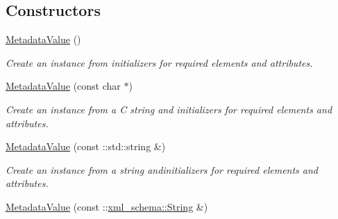 \subsection*{Constructors}
\begin{DoxyCompactItemize}
\item 
\hypertarget{classopenstack_1_1xml_1_1MetadataValue_acc7a6e57c54ab75faa5a0355a40f5956}{
\hyperlink{classopenstack_1_1xml_1_1MetadataValue_acc7a6e57c54ab75faa5a0355a40f5956}{MetadataValue} ()}
\label{classopenstack_1_1xml_1_1MetadataValue_acc7a6e57c54ab75faa5a0355a40f5956}

\begin{DoxyCompactList}\small\item\em Create an instance from initializers for required elements and attributes. \item\end{DoxyCompactList}\item 
\hypertarget{classopenstack_1_1xml_1_1MetadataValue_aa7963aeb675c71ba716501fee786f5a7}{
\hyperlink{classopenstack_1_1xml_1_1MetadataValue_aa7963aeb675c71ba716501fee786f5a7}{MetadataValue} (const char $\ast$)}
\label{classopenstack_1_1xml_1_1MetadataValue_aa7963aeb675c71ba716501fee786f5a7}

\begin{DoxyCompactList}\small\item\em Create an instance from a C string and initializers for required elements and attributes. \item\end{DoxyCompactList}\item 
\hypertarget{classopenstack_1_1xml_1_1MetadataValue_a5603eb41afb3cfda3c932860dcf8bb30}{
\hyperlink{classopenstack_1_1xml_1_1MetadataValue_a5603eb41afb3cfda3c932860dcf8bb30}{MetadataValue} (const ::std::string \&)}
\label{classopenstack_1_1xml_1_1MetadataValue_a5603eb41afb3cfda3c932860dcf8bb30}

\begin{DoxyCompactList}\small\item\em Create an instance from a string andinitializers for required elements and attributes. \item\end{DoxyCompactList}\item 
\hypertarget{classopenstack_1_1xml_1_1MetadataValue_a2db66d40cb0808599f286ca4e29a3498}{
\hyperlink{classopenstack_1_1xml_1_1MetadataValue_a2db66d40cb0808599f286ca4e29a3498}{MetadataValue} (const ::\hyperlink{namespacexml__schema_af6757b5701ccc893f3b551bd70e0c94d}{xml\_\-schema::String} \&)}
\label{classopenstack_1_1xml_1_1MetadataValue_a2db66d40cb0808599f286ca4e29a3498}


\end{DoxyCompactItemize}
